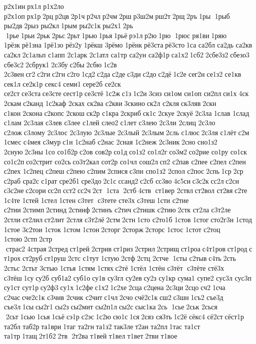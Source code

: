р2х1ин рх1л 
р1х2ло 
р2х1оп рх1р 2рц р2цв 2р1ч р2чл р2чм 2рш р3ш2м рш2т 2рщ 2ръ 1ры  1рыб 	ры2дв 2рыз 	ры2кл 1рым 
ры2с1к ры2х1 2рь  1рье 1рьи 2рьк 2рьс 2рьт 1рью 1рья 1рьё рэ1л р2ю 1рю  1рюс 	ря1ви 1ряю 	1рёзк рё1зна 
1рё1зо 	рёз2у 	1рёкш 	3рёмо 	1рёнк рё3ста рё3сто 1са 	са2бл 	са2дь 	са2кв 	са2кл 2с1альп 	с1апп 
2с1арк 
2с1атл 	са1тр 	са2ун 
са2ф1р са1х2 1сб2 2сбе3з2 сбезо3 
сбе3с2 2сбрук1 2с3бу с2бы 2сбю 1с2в 
2с3вен сг2 с2ги с2гн с2го 1сд2 с2да с2де с3ди с2до с2дё 1с2е 	сег2н се1з2 	се1кв 	сек1л 
се2к1р 	секс4 	семи1 сере2б 	се2ск 	се2ст се3ста се3сте сест1р се3стё 1с2ж с1з 1с2и 3сиз 	си1ом 	си1оп 	си2пл си1х 4ск  	2скам с2канд 
1с2каф 	2сках 	ск2ва 	с2кви 3скино ск2л 	с2кля ск3ляв 2скн 	с1кон 2скона с2копс 	2скош ск2р 	с1кра 2скриб ск1с 	2скуе 	2скуё 	2с3ла  	1слав 	1слад 	с1лам 
2с3лая 	с3лев 	с3лее 	с1лей 	слео2 	с1лет 	с3лею 	2с3ли  	2слиц 	2с3ло  	с2лож с3лому 
2с3лос 
2с3лую 
2с3лые 
2с3лый 
2с3лым 2сль 	с1люс 2с3ля 	с1лёт с2м 	1смес 	с4мея 	с3мур с1н 
1с2наб 	с2нас 	2сная 
1с2неж 
2с3ник 2сно 
сно1з2 	2сную 2с3ны 1со 
со1б2р с2ов 	сов2р со1д со1з2 
со1л2г со3м2 со2рие 	со1ру 	со1ск 
со1с2п со2стрит 	со2сь со3т2кал 	сот2р 	со1чл 	сош2л сп2 	с2пав 	с2пее 	с2пел 	с2пен 	с2пех 
1с2пец 	с2пеш 	с2пею 	с2пим 2спися с3пн 
спо1з2 	2спол 	с2пос 2спь 1ср 2ср  	с2раб 	сра2с 	с1рат 
сре2б1 сре3до 2с1с ссанд2 с2сб 	сс3во 4с5си с3с2к сс2л с2сн 
с3с2не с2сори сс2п сст2 сс2ч 2ст  1ста  2стб 4ств  ст1вер 	2ствл ст2вол 	ст2вя с2те 	1с4те  	1стей 	1стел 
1стен  
с3тет  с3тете 	сте3х 	с3теш 1сти 	с2тие 	с2тии 2стимп 2стинд 2стинф 2стинъ 	с2тич с2тишк 	с2тию 2стк 	ст2ла 
с3т2ле 	2стли ст2лил ст2лит 	2стля 
с3т2лё 2стм 2стн 1сто  
с2то1б 	1стов 	1стог сто2г3н 	1стод 	1стое 
3с2тои 	1сток 	1стом 	1стон 2сторг 2сторж 2сторс 	1стос 	1стот 	с2тоц 	1стою 2стп 2стр  страс2 4страя 2стред ст1рей 2стрив ст1риз 2стрил 2стрищ ст1роа с4т1ров ст1род ст1рох ст2руб ст1руш 2стс 	с1тут 	1стую 2стф 2стц 
2стче  1сты 	с2тыв с4ть 2сть  	2стьс 	2стьт 	3стью 	1стья 	1стям 	1стях с2тё 	1стёл 
1стён  
с3тёт  с3тёте 	стё3х 	с3тёш 1су су2б 
суб1а2 	суб1о су1в 	су3гл 	су2ев су2з 	су1кр 	сума1 	супе2 	сус3л 	сус3п 	су1ст 	сут1р су2ф3 су1х 1с2фе с1х2 1с2хе 2сца с2цена 2с3ци 2сцо сч2 1сча 	с2час сче2с1к 	с3чив 	2счик 	с2чит с1чл 2счо счё2с1к сш2 с3шн 1съ2 	съе3д 	съе3л 1сы сы2г1 сы2з сы2мит 
сы2п1л сы2с сыс1ка 2сь  1сье 2ськ 
2сься  2сьт 1сью 1сья 1сьё сэ1р с2эс 1с2ю сю1с 1ся 2сяз 	ся3ть 1с2ё 	сёкс4 	сё2ст сёст1р 	та2бл 	таб2р та1ври 1таг 	та2гн та1з2 так3ле т2ан 	та2пл 1тас 	та1ст 	та1тр 1тащ 2т1б2 2тв  2т2ва 	т1вей 	т1вел 	т1вет 2тви 	т1вое 
